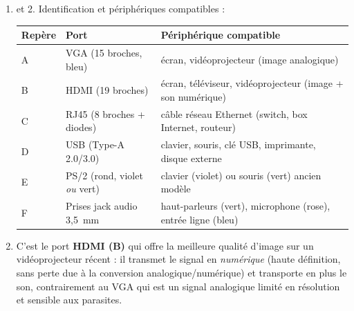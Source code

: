 \documentclass[11pt]{article}
\begin{document}
\begin{corrige}
\begin{enumerate}
  \item et 2. Identification et périphériques compatibles :
  \begin{center}
  \begin{tabularx}{\linewidth}{|l|l|X|}
  \hline
  \rowcolor{popblueL} \textbf{Repère} & \textbf{Port} & \textbf{Périphérique compatible} \\
  \hline
  A & VGA (15 broches, bleu) & écran, vidéoprojecteur (image analogique) \\
  \hline
  B & HDMI (19 broches) & écran, téléviseur, vidéoprojecteur (image + son numérique) \\
  \hline
  C & RJ45 (8 broches + diodes) & câble réseau Ethernet (switch, box Internet, routeur) \\
  \hline
  D & USB (Type-A 2.0/3.0) & clavier, souris, clé USB, imprimante, disque externe \\
  \hline
  E & PS/2 (rond, violet \emph{ou} vert) & clavier (violet) ou souris (vert) ancien modèle \\
  \hline
  F & Prises jack audio 3,5~mm & haut-parleurs (vert), microphone (rose), entrée ligne (bleu) \\
  \hline
  \end{tabularx}
  \end{center}
  \item C'est le port \textbf{HDMI (B)} qui offre la meilleure qualité d'image sur un vidéoprojecteur récent : il transmet le signal en \emph{numérique} (haute définition, sans perte due à la conversion analogique/numérique) et transporte en plus le son, contrairement au VGA qui est un signal analogique limité en résolution et sensible aux parasites.
\end{enumerate}
\end{corrige}
\end{document}
